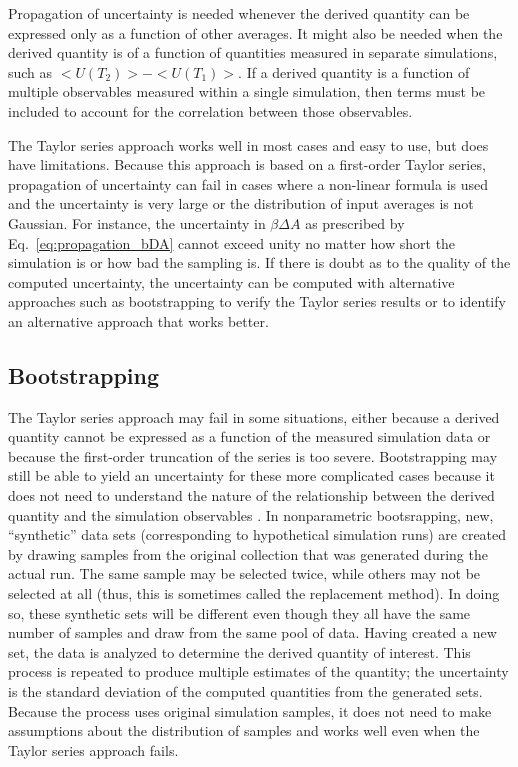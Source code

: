 Propagation of uncertainty is needed whenever the derived quantity can be expressed only as a function of other averages.  It might also be needed when the derived quantity is of a function of quantities measured in separate simulations, such as $<U(T_2)>-<U(T_1)>$.  If a derived quantity is a function of multiple observables measured within a single simulation, then terms must be included to account for the correlation between those observables.

The Taylor series approach works well in most cases and easy to use, but does have limitations.  Because this approach is based on a first-order Taylor series, propagation of uncertainty can fail in cases where a non-linear formula is used and the uncertainty is very large or the distribution of input averages is not Gaussian.  For instance, the uncertainty in $\beta \Delta A$ as prescribed by Eq.~\ref{eq:propagation_bDA} cannot exceed unity no matter how short the simulation is or how bad the sampling is.  If there is doubt as to the quality of the computed uncertainty, the uncertainty can be computed with alternative approaches such as bootstrapping to verify the Taylor series results or to identify an alternative approach that works better.

\subsection{Bootstrapping}

The Taylor series approach may fail in some situations, either because a derived quantity cannot be expressed as a function of the measured simulation data or because the first-order truncation of the series is too severe.  Bootstrapping may still be able to yield an uncertainty for these more complicated cases because it does not need to understand the nature of the relationship between the derived quantity and the simulation observables \cite{Tibshirani1998}.  In nonparametric bootsrapping, new, ``synthetic'' data sets (corresponding to hypothetical simulation runs) are created by drawing samples from the original collection that was generated during the actual run.  The same sample may be selected twice, while others may not be selected at all (thus, this is sometimes called the replacement method).  In doing so, these synthetic sets will be different even though they all have the same number of samples and draw from the same pool of data.  Having created a new set, the data is analyzed to determine the derived quantity of interest.  This process is repeated to produce multiple estimates of the quantity; the uncertainty is the standard deviation of the computed quantities from the generated sets. Because the process uses original simulation samples, it does not need to make assumptions about the distribution of samples and works well even when the Taylor series approach fails.

